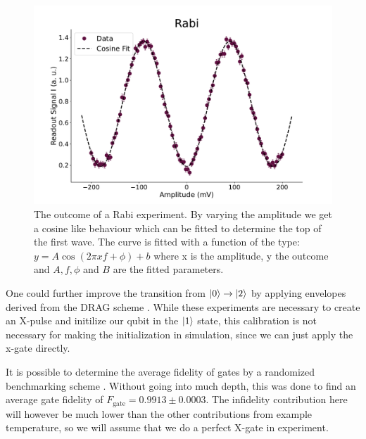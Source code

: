 \begin{figure}
    \centering
    \includegraphics{Calibrations/Figures/Rabi.pdf}
    \caption{The outcome of a Rabi experiment. By varying the amplitude we get a cosine like behaviour which can be fitted to determine the top of the first wave. The curve is fitted with a function of the type: $y = A \cos(2 \pi x f + \phi) + b$ where x is the amplitude, y the outcome and $A, f, \phi$ and $B$ are the fitted parameters.}
    \label{fig:calibration_rabi}
\end{figure}

One could further improve the transition from $\ket{0}\to\ket{2}$ by applying envelopes derived from the DRAG scheme \cite{motzoi_simple_2009}. While these experiments are necessary to create an X-pulse and initilize our qubit in the $\ket{1}$ state, this calibration is not necessary for making the initialization in simulation, since we can just apply the x-gate directly. 

It is possible to determine the average fidelity of gates by a randomized benchmarking scheme \cite{knill_randomized_2008}. Without going into much depth, this was done to find an average gate fidelity of $F_{\text{gate}} = 0.9913 \pm 0.0003$. The infidelity contribution here will however be much lower than the other contributions from example temperature, so we will assume that we do a perfect X-gate in experiment. 


